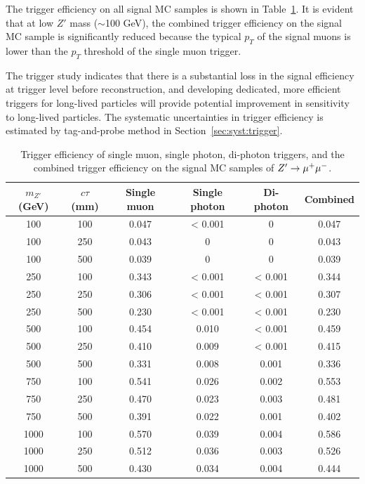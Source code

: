 The trigger efficiency on all \mumu signal MC samples is shown in Table~\ref{table:m_trig_eff_mumu}. It is evident that at low $Z'$ mass ($\sim$100 GeV), the combined trigger efficiency on the signal MC sample is significantly reduced because the typical $p_{T}$ of the signal muons is lower than the $p_{T}$ threshold of the single muon trigger.

The trigger study indicates that there is a substantial loss in the signal efficiency at trigger level before reconstruction, and developing dedicated, more efficient triggers for long-lived particles will provide potential improvement in sensitivity to long-lived particles. The systematic uncertainties in trigger efficiency is estimated by tag-and-probe method in Section~\ref{sec:syst:trigger}.

\begin{table}[!htb]
  \centering
  \begin{tabular}{ c c | c c c c}
    \hline
    \hline
    $m_{Z'}$ (GeV) & $c\tau$ (mm) & Single muon & Single photon & Di-photon & Combined \\
    \hline
    100			&	100	& 0.047 	& < 0.001   &0  	    &0.047  		\\
    100			&	250	& 0.043  	&0  	 	&0  	    &0.043  		\\
    100			&	500	& 0.039 	&0  	 	&0  	    &0.039  		\\
    250			&	100	& 0.343  	&< 0.001 	&< 0.001    &0.344  		\\
    250			&	250	& 0.306  	&< 0.001 	&< 0.001    &0.307  		\\
    250			&	500	& 0.230 	&< 0.001 	&< 0.001    &0.230  		\\
    500			&	100	& 0.454 	&0.010   	&< 0.001    &0.459  		\\
    500			&	250	& 0.410 	&0.009   	&< 0.001    &0.415  		\\
    500			&	500	& 0.331  	&0.008   	&0.001      &0.336  		\\
    750			&	100	& 0.541 	&0.026   	&0.002      &0.553  		\\
    750			&	250	& 0.470 	&0.023   	&0.003      &0.481  		\\
    750			&	500	& 0.391 	&0.022 	    &0.001      &0.402  		\\
    1000	    &	100	& 0.570   	&0.039   	&0.004      &0.586  		\\
    1000	    &	250	& 0.512   	&0.036   	&0.003      &0.526  		\\
    1000	    &	500	& 0.430   	&0.034 	    &0.004      &0.444  		\\
    \hline
    \hline
  \end{tabular}
  \caption{Trigger efficiency of single muon, single photon, di-photon triggers, and the combined trigger efficiency on the signal MC samples of $Z'\rightarrow\mu^{+}\mu^{-}$.}
  \label{table:m_trig_eff_mumu}
\end{table}

